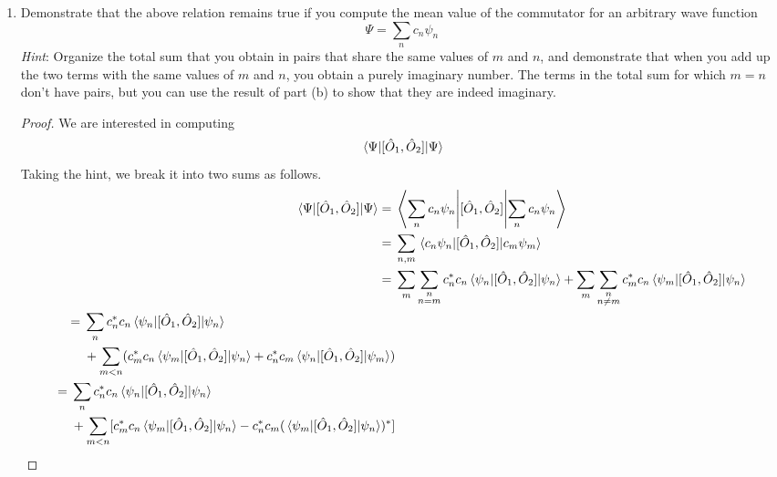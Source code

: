 \documentclass[../psets.tex]{subfiles}
\begin{document}
\begin{enumerate}
\begin{enumerate}
\begin{proof}
            Therefore, the mean value is equal to an imaginary number times an integral that will be real, so the final answer is, indeed, purely imaginary.
        \end{proof}
        \item Demonstrate that the above relation remains true if you compute the mean value of the commutator for an arbitrary wave function
        \begin{equation*}
            \Psi = \sum_nc_n\psi_n
        \end{equation*}
        \emph{Hint}: Organize the total sum that you obtain in pairs that share the same values of $m$ and $n$, and demonstrate that when you add up the two terms with the same values of $m$ and $n$, you obtain a purely imaginary number. The terms in the total sum for which $m=n$ don't have pairs, but you can use the result of part (b) to show that they are indeed imaginary.
        \begin{proof}
            We are interested in computing
            \begin{equation*}
                \ev{[\hat{O}_1,\hat{O}_2]}{\Psi}
            \end{equation*}
            Taking the hint, we break it into two sums as follows.
            \begin{align*}
                \ev{[\hat{O}_1,\hat{O}_2]}{\Psi} ={}& \ev{[\hat{O}_1,\hat{O}_2]}{\sum_nc_n\psi_n}\\
                ={}& \sum_{n,m}\mel{c_n\psi_n}{[\hat{O}_1,\hat{O}_2]}{c_m\psi_m}\\
                ={}& \sum_m\sum_{\substack{n\\n=m}}c_n^*c_n\ev{[\hat{O}_1,\hat{O}_2]}{\psi_n}+\sum_m\sum_{\substack{n\\n\neq m}}c_m^*c_n\mel{\psi_m}{[\hat{O}_1,\hat{O}_2]}{\psi_n}\\
                \begin{split}
                    ={}& \sum_nc_n^*c_n\ev{[\hat{O}_1,\hat{O}_2]}{\psi_n}\\
                    &+\sum_{m<n}(c_m^*c_n\mel{\psi_m}{[\hat{O}_1,\hat{O}_2]}{\psi_n}+c_n^*c_m\mel{\psi_n}{[\hat{O}_1,\hat{O}_2]}{\psi_m})
                \end{split}\\
                \begin{split}
                    ={}& \sum_nc_n^*c_n\ev{[\hat{O}_1,\hat{O}_2]}{\psi_n}\\
                    &+\sum_{m<n}[c_m^*c_n\mel{\psi_m}{[\hat{O}_1,\hat{O}_2]}{\psi_n}-c_n^*c_m(\mel{\psi_m}{[\hat{O}_1,\hat{O}_2]}{\psi_n})^*]

\end{split}
\end{align*}
\end{proof}
\end{enumerate}
\end{enumerate}
\end{document}
